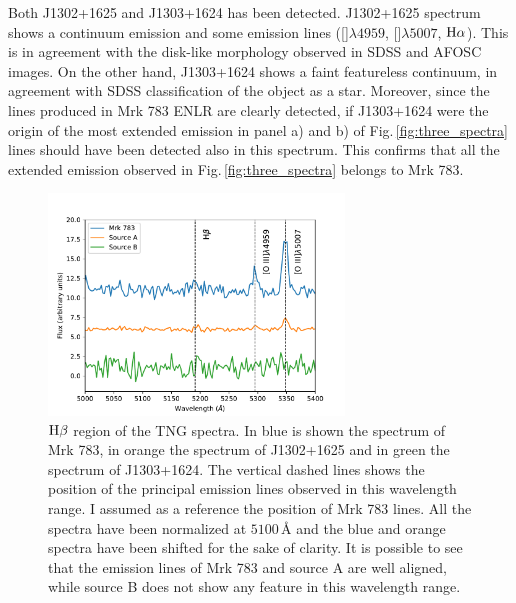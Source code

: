 \documentclass[../main.tex]{subfiles}
\begin{document}
Both J1302+1625 and J1303+1624 has been detected.
J1302+1625 spectrum shows a continuum emission and some emission lines ([]$\lambda4959$, []$\lambda5007$, $\rm H\alpha$).
This is in agreement with the disk-like morphology observed in SDSS and AFOSC images.
On the other hand, J1303+1624 shows a faint featureless continuum, in agreement with SDSS classification of the object as a star.
Moreover, since the lines produced in Mrk 783 ENLR are clearly detected, if J1303+1624 were the origin of the most extended emission in panel a) and b) of Fig.\,\ref{fig:three_spectra} lines should have been detected also in this spectrum.
This confirms that all the extended emission observed in Fig.\,\ref{fig:three_spectra} belongs to Mrk 783.

\begin{figure}
\centering
\includegraphics[width=0.7\textwidth]{images/paper3/companions_spec.pdf} 
\caption[]{$\rm H\beta$ region of the TNG spectra. In blue is shown the spectrum of Mrk 783, in orange the spectrum of J1302+1625 and in green the spectrum of J1303+1624. The vertical dashed lines shows the position of the principal emission lines observed in this wavelength range. I assumed as a reference the position of Mrk 783 lines. All the spectra have been normalized at $5100\,\si{\angstrom}$ and the blue and orange spectra have been shifted for the sake of clarity.
It is possible to see that the emission lines of Mrk 783 and source A are well aligned, while source B does not show any feature in this wavelength range.} 
\label{fig:companions_spec}
\end{figure} 
\end{document}
